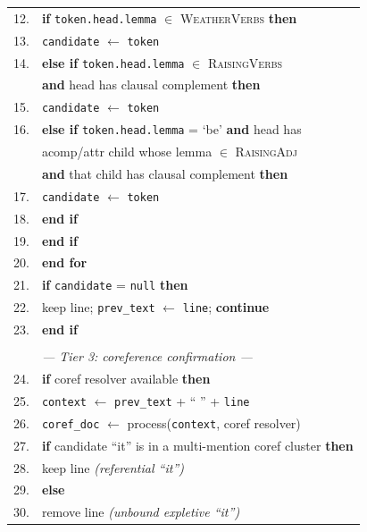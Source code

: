 \documentclass[11pt]{article}
\begin{document}
\begin{figure}[H]
\begin{tabular}{l l}
12. & \quad \quad \quad \textbf{if} \texttt{token.head.lemma} $\in$ \textsc{WeatherVerbs} \textbf{then} \\
13. & \quad \quad \quad \quad \texttt{candidate} $\gets$ \texttt{token} \\
14. & \quad \quad \quad \textbf{else if} \texttt{token.head.lemma} $\in$ \textsc{RaisingVerbs} \\
    & \quad \quad \quad \quad \textbf{and} head has clausal complement \textbf{then} \\
15. & \quad \quad \quad \quad \texttt{candidate} $\gets$ \texttt{token} \\
16. & \quad \quad \quad \textbf{else if} \texttt{token.head.lemma} = `be' \textbf{and} head has \\
    & \quad \quad \quad \quad acomp/attr child whose lemma $\in$ \textsc{RaisingAdj} \\
    & \quad \quad \quad \quad \textbf{and} that child has clausal complement \textbf{then} \\
17. & \quad \quad \quad \quad \texttt{candidate} $\gets$ \texttt{token} \\
18. & \quad \quad \quad \textbf{end if} \\
19. & \quad \quad \textbf{end if} \\
20. & \quad \textbf{end for} \\
21. & \quad \textbf{if} \texttt{candidate} = \texttt{null} \textbf{then} \\
22. & \quad \quad keep line; \texttt{prev\_text} $\gets$ \texttt{line}; \textbf{continue} \\
23. & \quad \textbf{end if} \\
    & \\
    & \quad \textit{--- Tier 3: coreference confirmation ---} \\
24. & \quad \textbf{if} coref resolver available \textbf{then} \\
25. & \quad \quad \texttt{context} $\gets$ \texttt{prev\_text} + `` '' + \texttt{line} \\
26. & \quad \quad \texttt{coref\_doc} $\gets$ process(\texttt{context}, coref resolver) \\
27. & \quad \quad \textbf{if} candidate ``it'' is in a multi-mention coref cluster \textbf{then} \\
28. & \quad \quad \quad keep line \quad \textit{(referential ``it'')} \\
29. & \quad \quad \textbf{else} \\
30. & \quad \quad \quad remove line \quad \textit{(unbound expletive ``it'')} \\

\end{tabular}
\end{figure}
\end{document}
